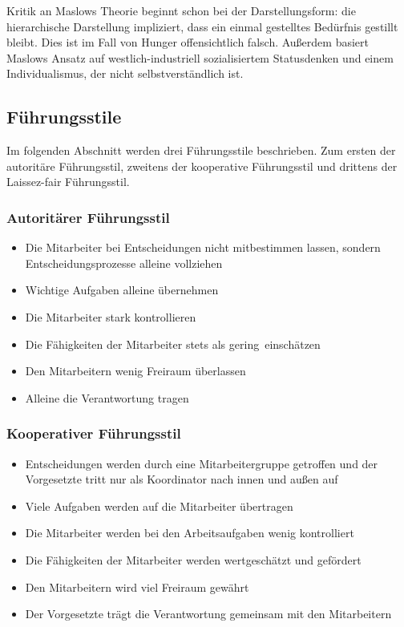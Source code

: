 Kritik an Maslows Theorie beginnt schon bei der Darstellungsform: die hierarchische Darstellung impliziert, dass ein einmal gestelltes Bedürfnis gestillt bleibt. Dies ist im Fall von Hunger offensichtlich falsch. Außerdem basiert Maslows Ansatz auf westlich-industriell sozialisiertem Statusdenken und einem Individualismus, der nicht selbstverständlich ist.


\subsection{Führungsstile}

Im folgenden Abschnitt werden drei Führungsstile beschrieben. Zum ersten der autoritäre Führungsstil, zweitens der kooperative Führungsstil und drittens der Laissez-fair Führungsstil.

\subsubsection{Autoritärer Führungsstil}
\begin{itemize}
	\item Die Mitarbeiter bei Entscheidungen nicht mitbestimmen lassen, sondern Entscheidungsprozesse alleine vollziehen
	\item Wichtige Aufgaben alleine übernehmen
	\item Die Mitarbeiter stark kontrollieren
	\item Die Fähigkeiten der Mitarbeiter stets als \ql gering\qr\ einschätzen
	\item Den Mitarbeitern wenig Freiraum überlassen
	\item Alleine die Verantwortung tragen
\end{itemize}

\subsubsection{Kooperativer Führungsstil}
\begin{itemize}
	\item Entscheidungen werden durch eine Mitarbeitergruppe getroffen und der Vorgesetzte tritt nur als Koordinator nach innen und außen auf
	\item Viele Aufgaben werden auf die Mitarbeiter übertragen
	\item Die Mitarbeiter werden bei den Arbeitsaufgaben wenig kontrolliert
	\item Die Fähigkeiten der Mitarbeiter werden wertgeschätzt und gefördert
	\item Den Mitarbeitern wird viel Freiraum gewährt
	\item Der Vorgesetzte trägt die Verantwortung gemeinsam mit den Mitarbeitern
\end{itemize}

